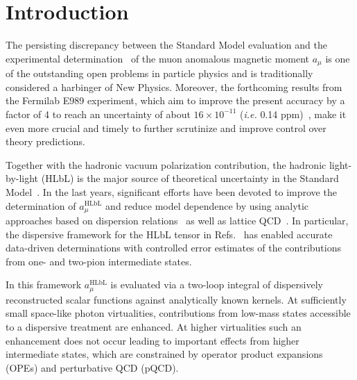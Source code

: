\section{Introduction}

The persisting discrepancy between the Standard Model evaluation and the experimental determination~\cite{BNL} of the muon anomalous magnetic moment $a_\mu$ is one of the outstanding open problems in particle physics and is traditionally considered a harbinger of New Physics. Moreover, the forthcoming results from the Fermilab E989 experiment, which aim to improve the present accuracy by a factor of 4 to reach an uncertainty of about $16 \times 10^{-11}$ ({\it i.e.} 0.14 ppm)~\cite{FermilabTDR}, make it even more crucial and timely to further scrutinize and improve control over theory predictions.

Together with the hadronic vacuum polarization contribution, the hadronic light-by-light (HLbL) is the major source of theoretical uncertainty in the Standard Model~\cite{Prades:2009tw,Jegerlehner:2009ry,Jegerlehner:2008zza}. In the last years, significant efforts have been devoted to improve the determination of $a_\mu^{\text{HLbL}}$ and reduce model dependence by using analytic approaches based on dispersion relations~\cite{Hoferichter:2013ama,BTT1,Colangelo:2014pva,BTT2,Colangelo:2017qdm,BTT3,Hoferichter:2014vra,PionTFFshort,PionTFF,Pauk:2014rfa,Danilkin:2016hnh,Hagelstein:2017obr} as well as lattice QCD~\cite{Blum:2014oka,Blum:2015gfa,Blum:2016lnc,Blum:2017cer,Blum:2019ugy,Green:2015sra,Asmussen:2019act}. In particular, the dispersive framework for the HLbL tensor in Refs.~\cite{Hoferichter:2013ama,BTT1,Colangelo:2014pva,BTT2,Colangelo:2017qdm,BTT3} has enabled accurate data-driven determinations with controlled error estimates of the contributions from one- and two-pion intermediate states.

In this framework $a_\mu^{\text{HLbL}}$ is evaluated via a two-loop integral of dispersively reconstructed scalar functions against analytically known kernels. At sufficiently small space-like photon virtualities, contributions from low-mass states accessible to a dispersive treatment are enhanced. At higher virtualities such an enhancement does not occur leading to important effects from higher intermediate states, which are constrained by operator product expansions (OPEs) and perturbative QCD (pQCD).

